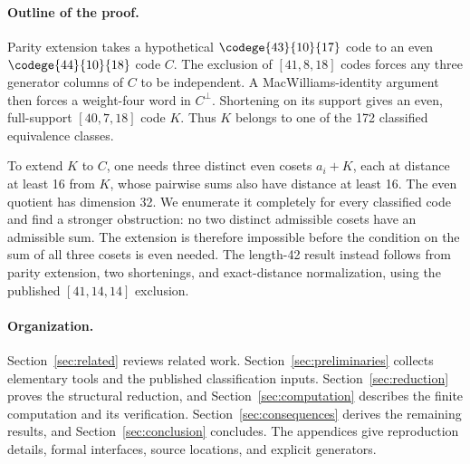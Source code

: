 \paragraph{Outline of the proof.}
Parity extension takes a hypothetical $\codege{43}{10}{17}$ code to an even $\codege{44}{10}{18}$ code $C$. The exclusion of $[41,8,18]$ codes \citep{bouyukliev2000} forces any three generator columns of $C$ to be independent. A MacWilliams-identity argument then forces a weight-four word in $C^\perp$. Shortening on its support gives an even, full-support $[40,7,18]$ code $K$. Thus $K$ belongs to one of the 172 classified equivalence classes.

To extend $K$ to $C$, one needs three distinct even cosets $a_i+K$, each at distance at least 16 from $K$, whose pairwise sums also have distance at least 16. The even quotient has dimension 32. We enumerate it completely for every classified code and find a stronger obstruction: no two distinct admissible cosets have an admissible sum. The extension is therefore impossible before the condition on the sum of all three cosets is even needed. The length-42 result instead follows from parity extension, two shortenings, and exact-distance normalization, using the published $[41,14,14]$ exclusion.

\paragraph{Organization.}
Section~\ref{sec:related} reviews related work. Section~\ref{sec:preliminaries} collects elementary tools and the published classification inputs. Section~\ref{sec:reduction} proves the structural reduction, and Section~\ref{sec:computation} describes the finite computation and its verification. Section~\ref{sec:consequences} derives the remaining results, and Section~\ref{sec:conclusion} concludes. The appendices give reproduction details, formal interfaces, source locations, and explicit generators.
